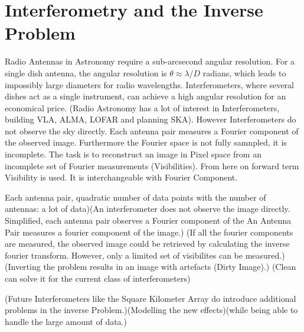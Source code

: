 \section{Interferometry and the Inverse Problem}\label{intro}
Radio Antennas in Astronomy require a sub-arcsecond angular resolution. For a single dish antenna, the angular resolution is $ \theta \approx \lambda / D$ radians, which leads to impossibly large diameters for radio wavelengths. Interferometers, where several dishes act as a single instrument, can achieve a high angular resolution for an economical price.  (Radio Astronomy has a lot of interest in Interferometers, building VLA, ALMA, LOFAR and planning SKA). However Interferometers do not observe the sky directly. Each antenna pair measures a Fourier component of the observed image. Furthermore the Fourier space is not fully samnpled, it is incomplete. The task is to reconstruct an image in Pixel space from an incomplete set of Fourier measurements (Visibilities). From here on forward term Visibility is used. It is interchangeable with Fourier Component.

Each antenna pair, quadratic number of data points with the number of antennas: a lot of data)(An interferometer does not observe the image directly. Simplified, each antenna pair observes a Fourier component of the An Antenna Pair measures a fourier component of the image.) (If all the fourier components are measured, the observed image could be retrieved by calculating the inverse fourier transform. However, only a limited set of visibilites can be measured.)(Inverting the problem results in an image with artefacts (Dirty Image).) (Clean can solve it for the current class of interferometers)

(Future Interferometers like the Square Kilometer Array do introduce additional problems in the inverse Problem.)(Modelling the new effects)(while being able to handle the large amount of data.)



